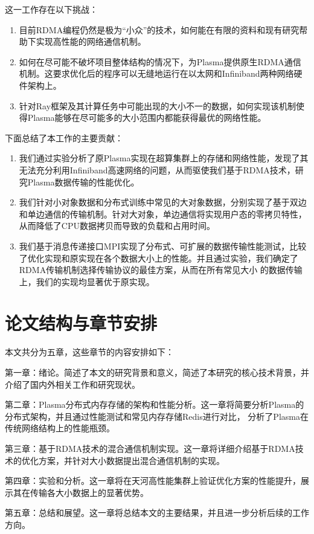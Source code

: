 这一工作存在以下挑战：

\begin{enumerate}
	\item 目前RDMA编程仍然是极为“小众”的技术，如何能在有限的资料和现有研究帮助下实现高性能的网络通信机制。
	\item 如何在尽可能不破坏项目整体结构的情况下，为Plasma提供原生RDMA通信机制。这要求优化后的程序可以无缝地运行在以太网和Infiniband两种网络硬件架构上。
	\item 针对Ray框架及其计算任务中可能出现的大小不一的数据，如何实现该机制使得Plasma能够在尽可能多的大小范围内都能获得最优的网络性能。
\end{enumerate}

下面总结了本工作的主要贡献：

\begin{enumerate}
	\item 我们通过实验分析了原Plasma实现在超算集群上的存储和网络性能，发现了其无法充分利用Infiniband高速网络的问题，从而驱使我们基于RDMA技术，研究Plasma数据传输的性能优化。
	\item 我们针对小对象数据和分布式训练中常见的大对象数据，分别实现了基于双边和单边通信的传输机制。针对大对象，单边通信将实现用户态的零拷贝特性，从而降低了CPU数据拷贝而导致的负载和占用时间。
	\item 我们基于消息传递接口MPI实现了分布式、可扩展的数据传输性能测试，比较了优化实现和原实现在各个数据大小上的性能。并且通过实验，我们确定了RDMA传输机制选择传输协议的最佳方案，从而在所有常见大小
	的数据传输上，我们的实现均显著优于原实现。
\end{enumerate}

\section{论文结构与章节安排}
\label{sec:arrangement}

本文共分为五章，这些章节的内容安排如下：

第一章：绪论。简述了本文的研究背景和意义，简述了本研究的核心技术背景，并介绍了国内外相关工作和研究现状。

第二章：Plasma分布式内存存储的架构和性能分析。这一章将简要分析Plasma的分布式架构，并且通过性能测试和常见内存存储Redis进行对比，
分析了Plasma在传统网络结构上的性能瓶颈。

第三章：基于RDMA技术的混合通信机制实现。这一章将详细介绍基于RDMA技术的优化方案，并针对大小数据提出混合通信机制的实现。

第四章：实验和分析。这一章将在天河高性能集群上验证优化方案的性能提升，展示其在传输各大小数据上的显著优势。

第五章：总结和展望。这一章将总结本文的主要结果，并且进一步分析后续的工作方向。
